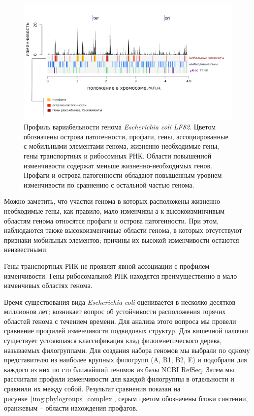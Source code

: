 \begin{figure}[!ht] 
    \center
      \includegraphics[width=\textwidth]{Dissertation/images/complexity/figure5plus.png}
    \caption{Профиль вариабельности генома \textit{Escherichia coli LF82}. Цветом обозначены острова патогенности, профаги,  гены, ассоциированные с мобильными элементами генома, жизненно-необходимые гены, гены транспортных и рибосомных РНК. Области повышенной изменчивости содержат меньше жизненно-необходимых генов. Профаги и острова патогенности обладают повышенным уровнем изменчивости по сравнению с остальной частью генома.}
    \label{img:complexity_lf82} 
  \end{figure}

Можно заметить, что участки генома в которых расположены жизненно необходимые гены, как правило, мало изменчивы а к высокоизминчивым областям генома относятся профаги и острова патогенности. При этом, наблюдаются также высокоизменчивые области генома, в которых отсутствуют признаки мобильных элементов; причины их высокой изменчивости остаются неизвестными. 

Гены транспортных РНК не проявлят явной ассоциации с профилем изменчивости. Гены рибосомальной РНК находятся преимущественно в мало изменчивых областях генома. 

Время существования вида \textit{Escherichia coli} оценивается в несколко десятков миллионов лет; возникает вопрос об устойчивости расположения горячих областей генома с течением времени. Для анализа этого вопроса мы провели сравнение профилей изменчивости подвидовых структур.  Для кишечной палочки существует устоявшаяся классификация клад филогенетического дерева, называемых филогруппами.  Для создания набора геномов мы выбрали по одному представителю из наиболее крупных филогрупп (A, B1, B2, E) и подобрали для каждого из них  по сто ближайший геномов из базы NCBI RefSeq. Затем мы рассчитали профили изменчивости для каждой филогруппы в отдельности и сравнили их между собой. Результат сравнения показан на рисунке~\ref{img:phylogroups_complex}, серым цветом обозначены блоки синтении, оранжевым -- области нахождения профагов.    

